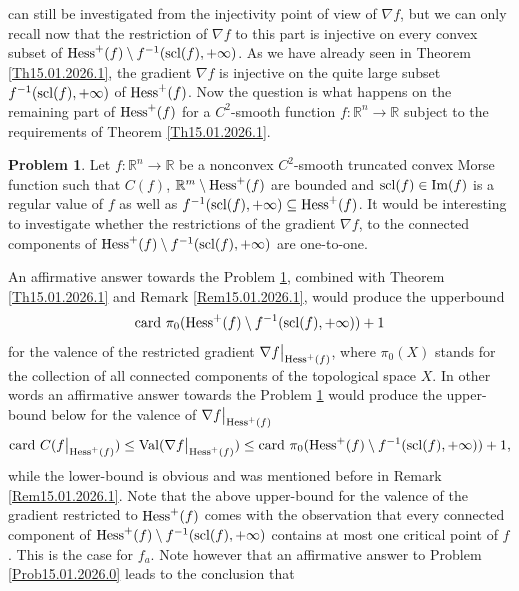 \documentclass[12pt,twoside,reqno]{amsart}
\theoremstyle{definition}
\newtheorem{problem}{Problem}[section]
\numberwithin{equation}{section}
\begin{document}
can still be investigated from the injectivity point of view of $\nabla f$, but we can only recall now that the restriction of $\nabla f$ to this part is injective on every convex subset of ${\rm Hess}^+(f)\setminus f^{-1}({\rm scl}(f),+\infty)$. As we have already seen in Theorem \ref{Th15.01.2026.1}, 
the gradient $\nabla f$ is injective on the quite large subset $f^{-1}({\rm scl}(f),+\infty)$ of 
${\rm Hess}^+(f)$. Now the question is what happens on 
the remaining part of ${\rm Hess}^+(f)$ for a $C^2$-smooth function $f:\mathbb{R}^n\longrightarrow\mathbb{R}$ subject to the requirements of Theorem \ref{Th15.01.2026.1}. 
\begin{problem}\label{Prob15.01.2026.1} Let $f:\mathbb{R}^n\longrightarrow\mathbb{R}$ 
be a nonconvex $C^2$-smooth truncated convex Morse function such that $C(f)$, $\mathbb{R}^m\setminus{\rm Hess}^+(f)$ are bounded and ${\rm scl}(f)\in {\rm Im}(f)$ is
a regular value of $f$ as well as $f^{-1}({\rm scl}(f),+\infty)\subseteq{\rm Hess}^+(f)$.
It would be interesting to investigate whether the restrictions of the gradient $\nabla f$, to the connected components of
${\rm Hess}^+(f)\setminus f^{-1}({\rm scl}(f),+\infty)$ are one-to-one.
\end{problem}
An affirmative answer towards the Problem \ref{Prob15.01.2026.1}, combined with Theorem \ref{Th15.01.2026.1} and Remark \ref{Rem15.01.2026.1}, would 
produce the upperbound \[{\rm card}~\pi_0({\rm Hess}^+(f)\setminus f^{-1}({\rm scl}(f),+\infty))+1\] for the valence of the restricted gradient 
$\nabla f\big|_{{\rm Hess}^+(f)}$, where $\pi_0(X)$ stands 
for the collection of all connected components of the topological space $X$. In other words an affirmative answer towards the Problem \ref{Prob15.01.2026.1}
would produce the upper-bound below for the valence of $\nabla f\big|_{{\rm Hess}^+(f)}$
\begin{equation}\label{eq15.01.2026.2}
{\rm card}~C(f\big|_{{\rm Hess}^+(f)})\leq {\rm Val}(\nabla f\big|_{{\rm Hess}^+(f)})\leq{\rm card}~\pi_0({\rm Hess}^+(f)\setminus f^{-1}({\rm scl}(f),+\infty))+1,
\end{equation}
while the lower-bound is obvious and was mentioned before in Remark \ref{Rem15.01.2026.1}. Note that the above upper-bound for the valence of the gradient restricted 
to ${\rm Hess}^+(f)$ comes with the observation that every connected component of ${\rm Hess}^+(f)\setminus f^{-1}({\rm scl}(f),+\infty)$ contains 
at most one critical point of $f$. This is the case for $f_a$. Note however that an affirmative answer to Problem \ref{Prob15.01.2026.0} leads to the conclusion that 
\end{document}

